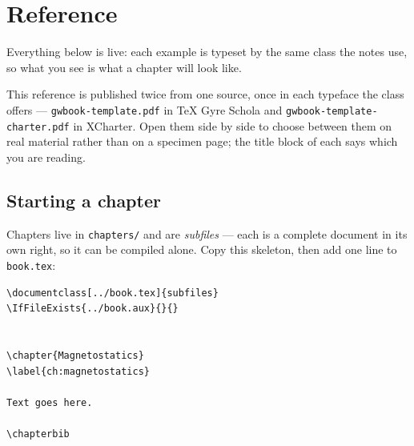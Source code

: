 
\maketitle
\tableofcontents

\chapter{Reference}
\label{ch:reference}

Everything below is live: each example is typeset by the same class the notes
use, so what you see is what a chapter will look like.

This reference is published twice from one source, once in each typeface the
class offers --- \mbox{\texttt{gwbook-template.pdf}} in TeX Gyre Schola and
\mbox{\texttt{gwbook-template-charter.pdf}} in XCharter. Open them side by side to choose
between them on real material rather than on a specimen page; the title block
of each says which you are reading.

\section{Starting a chapter}

Chapters live in \texttt{chapters/} and are \emph{subfiles} --- each is a
complete document in its own right, so it can be compiled alone. Copy this
skeleton, then add one \verb|| line to \texttt{book.tex}:

\begin{verbatim}
\documentclass[../book.tex]{subfiles}
\IfFileExists{../book.aux}{}{}


\chapter{Magnetostatics}
\label{ch:magnetostatics}

Text goes here.

\chapterbib

\end{verbatim}


